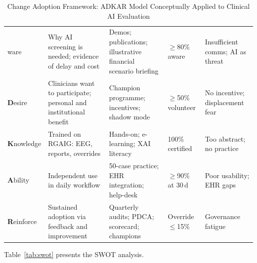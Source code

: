 \begin{table}[H]
\tablestripes\tablefontsize
\tablefontsize
\caption[Change Adoption Framework]{Change Adoption Framework: ADKAR Model Conceptually Applied to Clinical AI Evaluation}
\begin{tabularx}{\textwidth}{@{} L L L L L @{}}
\toprule
{} &  &  &  &  \\
\midrule
{}ware & Why AI screening is needed; evidence of delay and cost & Demos; publications; illustrative financial scenario briefing & $\geq$80\% aware & Insufficient comms; AI as threat \\
\addlinespace
\textbf{D}esire & Clinicians want to participate; personal and institutional benefit & Champion programme; incentives; shadow mode & $\geq$50\% volunteer & No incentive; displacement fear \\
\addlinespace
\textbf{K}nowledge & Trained on RGAIG: EEG, reports, overrides & Hands-on; e-learning; XAI literacy & 100\% certified & Too abstract; no practice \\
\addlinespace
\textbf{A}bility & Independent use in daily workflow & 50-case practice; EHR integration; help-desk & $\geq$90\% at 30\,d & Poor usability; EHR gaps \\
\addlinespace
\textbf{R}einforce & Sustained adoption via feedback and improvement & Quarterly audits; PDCA; scorecard; champions & Override$\leq$15\% & Governance fatigue \\
\bottomrule
\end{tabularx}
\end{table}

Table~\ref{tab:swot} presents the SWOT analysis.

